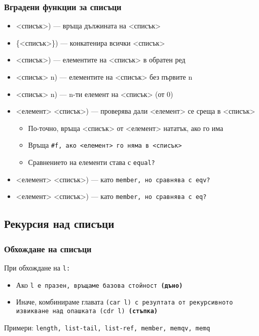 \documentclass{beamer}
\begin{document}
\begin{frame}
  \frametitle{Вградени функции за списъци}
  \small

  \begin{itemize}[<+->]
  \item {}<списък>\tta) --- връща дължината на <списък>
  \item {}\{<списък>\}\tta) --- конкатенира всички <списък>
  \item {}<списък>\tta) --- елементите на <списък> в обратен ред
  \item {}<списък> n\tta) --- елементите на <списък> без първите n
  \item {}<списък> n\tta) --- n-ти елемент на <списък> (от 0)
  \item {}<елемент> <списък>\tta) --- проверява дали <елемент> се среща в <списък>
    \begin{itemize}
    \item По-точно, връща <списък> от <елемент> нататък, ако го има
    \item Връща \tt{\#f}, ако <елемент> го няма в <списък>
    \item Сравнението на елементи става с \tt{equal?}
    \end{itemize}
  \item {}<елемент> <списък>\tta) --- като \tt{member}, но сравнява с \tt{eqv?}
  \item {}<елемент> <списък>\tta) --- като \tt{member}, но сравнява с \tt{eq?}
  \end{itemize}
\end{frame}

\subsection{Рекурсия над списъци}


\begin{frame}
  \frametitle{Обхождане на списъци}

  При обхождане на \tt l:
  \begin{itemize}
  \item Ако \tt l е празен, връщаме базова стойност \textbf{(дъно)}
  \item Иначе, комбинираме главата \tt{(car l)} с резултата от рекурсивното извикване над опашката \tt{(cdr l)} \textbf{(стъпка)}
  \end{itemize}

  \pause
  \vspace{2em}
  Примери: \tt{length}, \tt{list-tail}, \tt{list-ref}, \tt{member}, \tt{memqv}, \tt{memq}
\end{frame}
\end{document}
